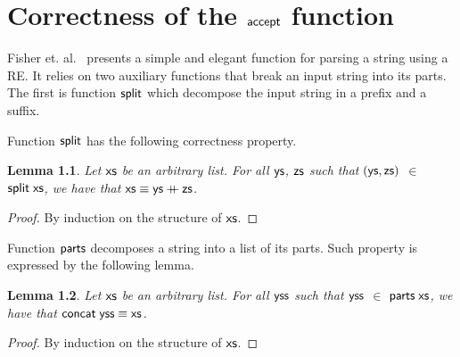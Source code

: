 \documentclass[oneside,12pt]{scrbook}
\newcommand{\plus}{\mathbin{+\!\!\!+}}
\def\resethooks{%
	\global\let\SaveRestoreHook\empty
	\global\let\ColumnHook\empty}
\let\hspre\empty
\let\hspost\empty
\newtheorem{Lemma}{Lemma}
\theoremstyle{definition}
\newcommand{\C}[1]{\red{\mathsf{#1}}}
\newcommand{\F}[1]{\green{\mathsf{#1}}}
\newcommand{\V}[1]{\black{\mathsf{#1}}}
\theoremstyle{plain}
\theoremstyle{definition}
\begin{document}



\appendix

\chapter{Correctness of the \ensuremath{\F{accept}} function}\label{appendix:accept}


Fisher et. al.~\cite{Fischer2010} presents a simple and elegant function for parsing a string using a RE. It relies on two
auxiliary functions that break an input string into its parts. The first is function \ensuremath{\F{split}} which decompose the input string in
a prefix and a suffix.
\resethooks
Function \ensuremath{\F{split}} has the following correctness property.
\begin{Lemma}
	Let \ensuremath{\V{xs}} be an arbitrary list. For all \ensuremath{\V{ys}}, \ensuremath{\V{zs}} such that \ensuremath{(\V{ys},\V{zs})} $\in$ \ensuremath{\F{split}\;\V{xs}}, we have that \ensuremath{\V{xs}\equiv \V{ys}\plus \V{zs}}.
\end{Lemma}
\begin{proof}
	By induction on the structure of \ensuremath{\V{xs}}. 
\end{proof}
Function \ensuremath{\F{parts}} decomposes a string into a list of its parts. Such property is expressed by the following lemma.
\begin{Lemma}
	Let \ensuremath{\V{xs}} be an arbitrary list. For all \ensuremath{\V{yss}} such that \ensuremath{\V{yss}} $\in$ \ensuremath{\F{parts}\;\V{xs}}, we have that \ensuremath{\F{concat}\;\V{yss}\equiv \V{xs}}.
\end{Lemma}
\begin{proof}
	By induction on the structure of \ensuremath{\V{xs}}.
\end{proof}
\end{document}
